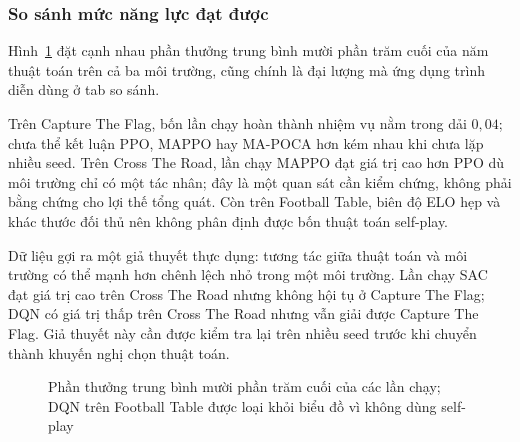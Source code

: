 \subsubsection{So sánh mức năng lực đạt được}
\indent Hình~\ref{fig:success_bar} đặt cạnh nhau phần thưởng trung bình mười phần trăm
cuối của năm thuật toán trên cả ba môi trường, cũng chính là đại lượng mà ứng dụng trình diễn
dùng ở tab so sánh. 

\indent Trên Capture The Flag, bốn lần chạy hoàn thành nhiệm vụ nằm trong dải $0{,}04$;
chưa thể kết luận PPO, MAPPO hay MA-POCA hơn kém nhau khi chưa lặp nhiều seed. Trên Cross
The Road, lần chạy MAPPO đạt giá trị cao hơn PPO dù môi trường chỉ có một tác nhân; đây là
một quan sát cần kiểm chứng, không phải bằng chứng cho lợi thế tổng quát. Còn trên Football
Table, biên độ ELO hẹp và khác thước đối thủ nên không phân định được bốn thuật toán self-play.

\indent Dữ liệu gợi ra một giả thuyết thực dụng: tương tác giữa thuật toán và môi trường có
thể mạnh hơn chênh lệch nhỏ trong một môi trường. Lần chạy SAC đạt giá trị cao trên Cross
The Road nhưng không hội tụ ở Capture The Flag; DQN có giá trị thấp trên Cross The Road
nhưng vẫn giải được Capture The Flag. Giả thuyết này cần được kiểm tra lại trên nhiều seed
trước khi chuyển thành khuyến nghị chọn thuật toán.

\begin{figure}[H]
    \centering
    \caption{Phần thưởng trung bình mười phần trăm cuối của các lần chạy; DQN trên
    Football Table được loại khỏi biểu đồ vì không dùng self-play}
    \label{fig:success_bar}
\end{figure}

